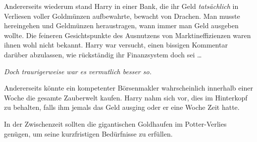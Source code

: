 Andererseits wiederum stand Harry in einer Bank, die ihr Geld \emph{tatsächlich} in Verliesen voller Goldmünzen aufbewahrte, bewacht von Drachen. Man musste hereingehen und Geldmünzen heraustragen, wann immer man Geld ausgeben wollte. Die feineren Gesichtspunkte des Ausnutzens von Marktineffizienzen waren ihnen wohl nicht bekannt. Harry war versucht, einen bissigen Kommentar darüber abzulassen, wie rückständig ihr Finanzsystem doch sei …

\emph{Doch traurigerweise war es vermutlich besser so.}

Andererseits könnte ein kompetenter Börsenmakler wahrscheinlich innerhalb einer Woche die gesamte Zauberwelt kaufen. Harry nahm sich vor, dies im Hinterkopf zu behalten, falls ihm jemals das Geld ausging oder er eine Woche Zeit hatte.

In der Zwischenzeit sollten die gigantischen Goldhaufen im Potter-Verlies genügen, um seine kurzfristigen Bedürfnisse zu erfüllen.

